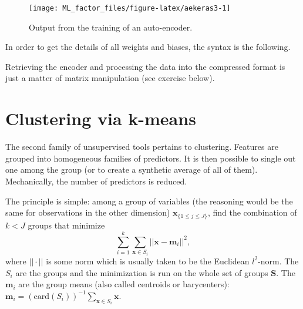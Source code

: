 \documentclass[]{krantz}
\makeatletter
\newenvironment{Shaded}{\begin{snugshade}}{\end{snugshade}}
\newcommand{\KeywordTok}[1]{\textcolor[rgb]{0.27,0.27,0.27}{\textbf{#1}}}
\newcommand{\NormalTok}[1]{#1}
\newcommand{\OperatorTok}[1]{\textcolor[rgb]{0.43,0.43,0.43}{\textbf{#1}}}
\newcommand{\StringTok}[1]{\textcolor[rgb]{0.5,0.5,0.5}{#1}}
\newenvironment{kframe}{%
\medskip{}
\setlength{\fboxsep}{.8em}
 \def\at@end@of@kframe{}%
 \ifinner\ifhmode%
  \def\at@end@of@kframe{\end{minipage}}%
  \begin{minipage}{\columnwidth}%
 \fi\fi%
 \def\FrameCommand##1{\hskip\@totalleftmargin \hskip-\fboxsep
 \colorbox{shadecolor}{##1}\hskip-\fboxsep
     \hskip-\linewidth \hskip-\@totalleftmargin \hskip\columnwidth}%
 \MakeFramed {\advance\hsize-\width
   \@totalleftmargin\z@ \linewidth\hsize
   \@setminipage}}%
 {\par\unskip\endMakeFramed%
 \at@end@of@kframe}
\renewenvironment{Shaded}{\begin{kframe}}{\end{kframe}}
\theoremstyle{definition}
\theoremstyle{definition}
\theoremstyle{definition}
\theoremstyle{remark}
\makeatother
\begin{document}
\begin{figure}[H]

{\centering \texttt{[image: ML\_factor\_files/figure-latex/aekeras3-1]} 

}

\caption{Output from the training of an auto-encoder.}\label{fig:aekeras3}
\end{figure}

\normalsize

In order to get the details of all weights and biases, the syntax is the
following.

\footnotesize

\begin{Shaded}
\end{Shaded}

\normalsize

Retrieving the encoder and processing the data into the compressed
format is just a matter of matrix manipulation (see exercise below).

\hypertarget{clustering-via-k-means}{%
\section{Clustering via k-means}\label{clustering-via-k-means}}

The second family of unsupervised tools pertains to clustering. Features
are grouped into homogeneous families of predictors. It is then possible
to single out one among the group (or to create a synthetic average of
all of them). Mechanically, the number of predictors is reduced.

The principle is simple: among a group of variables (the reasoning would
be the same for observations in the other dimension)
\(\textbf{x}_{\{1 \le j \le J\}}\), find the combination of \(k<J\)
groups that minimize \begin{equation}
\label{eq:kmeans}
\sum_{i=1}^k\sum_{\textbf{x}\in S_i}||\textbf{x}-\textbf{m}_i||^2,
\end{equation} where \(||\cdot ||\) is some norm which is usually taken
to be the Euclidean \(l^2\)-norm. The \(S_i\) are the groups and the
minimization is run on the whole set of groups \(\textbf{S}\). The
\(\textbf{m}_i\) are the group means (also called centroids or
barycenters):
\(\textbf{m}_i=(\text{card}(S_i))^{-1}\sum_{\textbf{x}\in S_i}\textbf{x}\).
\end{document}
